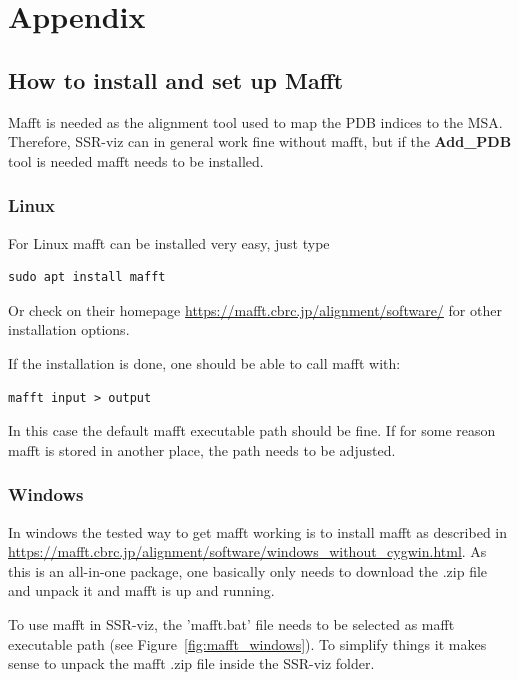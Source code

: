 \documentclass[a4paper,10pt]{article}
\begin{document}
\section{Appendix} \label{appendix}

\subsection{How to install and set up Mafft} \label{mafft}

Mafft is needed as the alignment tool used to map the PDB indices to the MSA. Therefore, SSR-viz can in 
general work fine without mafft, but if the \textbf{Add\_PDB} tool is needed mafft needs to be installed.

\subsubsection{Linux}

For Linux mafft can be installed very easy, just type 

\begin{verbatim} 
sudo apt install mafft
\end{verbatim}

Or check on their homepage 
\url{https://mafft.cbrc.jp/alignment/software/}
for other installation options.

If the installation is done, one should be able to call mafft with:

\begin{verbatim} 
mafft input > output
\end{verbatim}

In this case the default mafft executable path should be fine.
If for some reason mafft is stored in another place, the path needs to be adjusted.

\subsubsection{Windows}

In windows the tested way to get mafft working is to 
install mafft as described in \url{https://mafft.cbrc.jp/alignment/software/windows_without_cygwin.html}.
As this is an all-in-one package, one basically only needs to download the .zip file and unpack it and 
mafft is up and running.

To use mafft in SSR-viz, the 'mafft.bat' file needs to be selected as mafft executable path (see Figure~\ref{fig:mafft_windows}).
To simplify things it makes sense to unpack the mafft .zip file inside the SSR-viz folder. 
\end{document}
